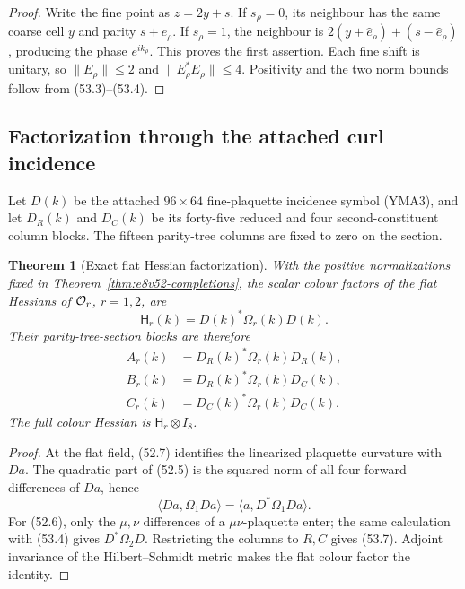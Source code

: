 \documentclass[11pt,oneside]{book}
\newtheorem{theorem}{Theorem}[chapter]
\theoremstyle{definition}
\theoremstyle{remark}
\begin{document}
\begin{proof}
Write the fine point as \(z=2y+s\).  If \(s_\rho=0\), its neighbour
has the same coarse cell \(y\) and parity
\(s+\widehat e_\rho\).  If \(s_\rho=1\), the neighbour is
\(2(y+\widehat e_\rho)+(s-\widehat e_\rho)\), producing the phase
\(e^{ik_\rho}\).  This proves the first assertion.
Each fine shift is unitary, so \(\|E_\rho\|\le2\) and
\(\|E_\rho^*E_\rho\|\le4\).  Positivity and the two norm bounds
follow from (53.3)--(53.4).
\end{proof}

\subsection{Factorization through the attached curl incidence}

Let \(D(k)\) be the attached \(96\times64\) fine-plaquette
incidence symbol (YMA3), and let \(D_R(k)\) and \(D_C(k)\) be its
forty-five reduced and four second-constituent column blocks.  The
fifteen parity-tree columns are fixed to zero on the section.

\begin{theorem}[Exact flat Hessian factorization]
\label{thm:e8v53-Hessian-factorization}
With the positive normalizations fixed in
Theorem~\ref{thm:e8v52-completions}, the scalar colour factors of
the flat Hessians of \({\cal O}_r\), \(r=1,2\), are
\[
 \boxed{{\mathsf H}_r(k)=D(k)^*\Omega_r(k)D(k).}               \tag{53.6}
\]
Their parity-tree-section blocks are therefore
\[
\boxed{\begin{aligned}
 A_r(k)&=D_R(k)^*\Omega_r(k)D_R(k),\\
 B_r(k)&=D_R(k)^*\Omega_r(k)D_C(k),\\
 C_r(k)&=D_C(k)^*\Omega_r(k)D_C(k).
\end{aligned}}                                                \tag{53.7}
\]
The full colour Hessian is
\({\mathsf H}_r\otimes I_8\).
\end{theorem}

\begin{proof}
At the flat field, (52.7) identifies the linearized plaquette
curvature with \(Da\).  The quadratic part of (52.5) is the squared
norm of all four forward differences of \(Da\), hence
\[
 \langle Da,\Omega_1Da\rangle
 =\langle a,D^*\Omega_1Da\rangle.
\]
For (52.6), only the \(\mu,\nu\) differences of a
\(\mu\nu\)-plaquette enter; the same calculation with (53.4) gives
\(D^*\Omega_2D\).  Restricting the columns to \(R,C\) gives
(53.7).  Adjoint invariance of the Hilbert--Schmidt metric makes
the flat colour factor the identity.
\end{proof}
\end{document}
